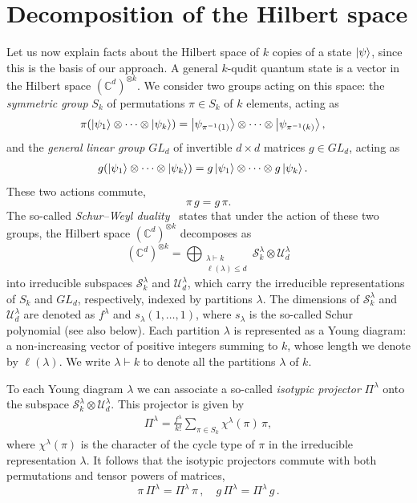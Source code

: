 \documentclass[aps,pra,twocolumn,superscriptaddress]{revtex4-2}
\newcommand{\ot}{\otimes}
\newcommand{\C}{\mathds{C}}
\newcommand{\cdk}{(\C^d)^{\otimes k}}
\begin{document}
\section{Decomposition of the Hilbert space}
Let us now explain facts about the Hilbert space of $k$ copies of a state $\ket{\psi}$, since this is the basis of our approach.
A general $k$-qudit quantum state is a vector in the Hilbert space $\cdk$. We consider two groups acting on this space: the \emph{symmetric group} $S_k$ of permutations $\pi\in S_k$ of $k$ elements, acting as
\begin{align}
    \pi (\ket{\psi_1} \ot \dots \ot \ket{\psi_k}) &= \ket{\psi_{\pi^{-1}(1)}} \ot \dots \ot \ket{\psi_{\pi^{-1}(k)}},
\end{align}
and the \emph{general linear group} $GL_d$ of invertible $d\times d$ matrices $g\in GL_d$, acting as
\begin{align}
g(\ket{\psi_1} \ot \dots \ot \ket{\psi_k}) &=g\ket{\psi_1} \ot \dots \ot g\ket{\psi_k}.
\end{align}
These two actions commute,
\begin{equation}\label{eq:PerUniCommute}
    \pi \, g = g \, \pi.
\end{equation}
The so-called \emph{Schur--Weyl duality}~\cite{fulton2013representation} states that under the action of these two groups, the Hilbert space $\cdk$ decomposes as
\begin{equation}
    \cdk = \bigoplus_{\substack{\lambda\vdash k \\ \ell(\lambda)\leq d}} \mathcal{S}^\lambda_k \ot \mathcal{U}^\lambda_d
\end{equation}
into irreducible subspaces $\mathcal{S}^\lambda_k$ and $\mathcal{U}^\lambda_d$, which carry the irreducible representations
of $S_k$ and $GL_d$, respectively, indexed by partitions $\lambda$. The dimensions of $\mathcal{S}^\lambda_k$ and $\mathcal{U}^\lambda_d$ are denoted as $f^\lambda$ and $s_\lambda(1,\dots,1)$, where $s_\lambda$ is the so-called Schur polynomial (see also below). Each partition $\lambda$ is represented as a Young diagram: a non-increasing vector of positive integers summing to $k$, whose length we denote by $\ell(\lambda)$.  We write $\lambda \vdash k$ to denote all the partitions $\lambda$ of $k$.

To each Young diagram $\lambda$ we can associate a so-called {\em isotypic projector} $\Pi^\lambda$ onto the subspace $\mathcal{S}^\lambda_k \ot \mathcal{U}^\lambda_d$. This projector is given by
\begin{align}
    \Pi^\lambda = \frac{f^\lambda}{k!}\sum_{\pi \in S_k} \chi^\lambda(\pi)\, \pi,
\end{align}
where $\chi^\lambda(\pi)$ is the character of the cycle type of $\pi$ in the irreducible representation $\lambda$. It follows that the isotypic projectors commute with both permutations and tensor powers of matrices,
\begin{equation}
    \pi\,\Pi^\lambda = \Pi^\lambda\,\pi\,,\quad g\,\Pi^\lambda = \Pi^\lambda\,g\,.
\end{equation}
\end{document}
